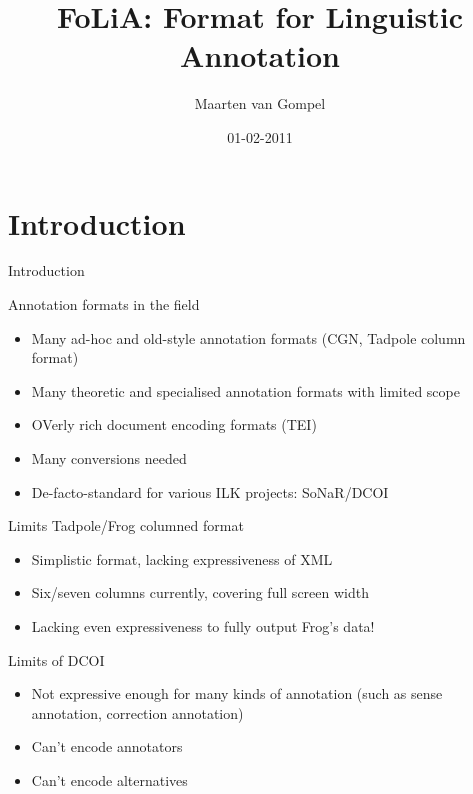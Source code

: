 \documentclass[compress]{beamer}
\title{FoLiA: Format for Linguistic Annotation}
\author{Maarten van Gompel}
\date{01-02-2011}
\begin{document}
\begin{frame}
	\titlepage %
\end{frame}

\section{Introduction}

\begin{frame}{Introduction}

    \begin{block}{Annotation formats in the field}
        \begin{itemize}
            \item Many ad-hoc and old-style annotation formats (CGN, Tadpole column format) 
            \item Many theoretic and specialised annotation formats with limited scope
            \item OVerly rich document encoding formats (TEI)
            \item Many conversions needed
            \item De-facto-standard for various ILK projects: SoNaR/DCOI
        \end{itemize}
    \end{block}
    
    \begin{block}{Limits Tadpole/Frog columned format}
        \begin{itemize}
            \item Simplistic format, lacking expressiveness of XML
            \item Six/seven columns currently, covering full screen width
            \item Lacking even expressiveness to fully output Frog's data!
        \end{itemize}
    \end{block}

    \begin{block}{Limits of DCOI}
        \begin{itemize}
            \item Not expressive enough for many kinds of annotation (such as sense annotation, correction annotation)
            \item Can't encode annotators
            \item Can't encode alternatives
        \end{itemize}
    \end{block}

\end{frame}
\end{document}
